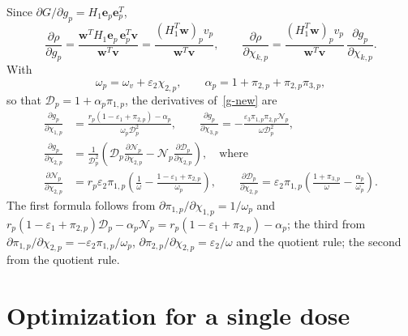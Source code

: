 \documentclass[11pt]{article}
\theoremstyle{plain}
\theoremstyle{remark}
\numberwithin{equation}{section}
\begin{document}
Since $\partial G/\partial g_p=H_1\bm e_p\bm e_p^T$,
\begin{equation}\label{drho-dg}
\frac{\partial\rho}{\partial g_p}=\frac{\bm w^TH_1\bm e_p\,\bm e_p^T\bm v}{\bm w^T\bm v}
=\frac{\left(H_1^T\bm w\right)_pv_p}{\bm w^T\bm v},
\qquad
\frac{\partial\rho}{\partial\chi_{k,p}}=\frac{\left(H_1^T\bm w\right)_pv_p}{\bm w^T\bm v}\,
\frac{\partial g_p}{\partial\chi_{k,p}}.
\end{equation}
With
\begin{equation}\label{omega-alpha}
\omega_p=\omega_v+\varepsilon_2\chi_{2,p},\qquad
\alpha_p=1+\pi_{2,p}+\pi_{2,p}\pi_{3,p},
\end{equation}
so that $\mathcal{D}_p=1+\alpha_p\pi_{1,p}$, the derivatives of~\eqref{g-new} are
\begin{equation}\label{dg}
\begin{aligned}
\frac{\partial g_p}{\partial\chi_{1,p}}&=\frac{r_p\left(1-\varepsilon_1+\pi_{2,p}\right)-\alpha_p}{\omega_p\mathcal{D}_p^2},\qquad
\frac{\partial g_p}{\partial\chi_{3,p}}=-\frac{\varepsilon_3\pi_{1,p}\pi_{2,p}\mathcal{N}_p}{\omega\mathcal{D}_p^2},\\
\frac{\partial g_p}{\partial\chi_{2,p}}&=\frac{1}{\mathcal{D}_p^2}\left(\mathcal{D}_p\frac{\partial\mathcal{N}_p}{\partial\chi_{2,p}}-\mathcal{N}_p\frac{\partial\mathcal{D}_p}{\partial\chi_{2,p}}\right),\quad\mbox{where}\\
\frac{\partial\mathcal{N}_p}{\partial\chi_{2,p}}&=r_p\varepsilon_2\pi_{1,p}\left(\frac{1}{\omega}-\frac{1-\varepsilon_1+\pi_{2,p}}{\omega_p}\right),\qquad
\frac{\partial\mathcal{D}_p}{\partial\chi_{2,p}}=\varepsilon_2\pi_{1,p}\left(\frac{1+\pi_{3,p}}{\omega}-\frac{\alpha_p}{\omega_p}\right).
\end{aligned}
\end{equation}
The first formula follows from $\partial\pi_{1,p}/\partial\chi_{1,p}=1/\omega_p$ and
$r_p(1-\varepsilon_1+\pi_{2,p})\mathcal{D}_p-\alpha_p\mathcal{N}_p
=r_p(1-\varepsilon_1+\pi_{2,p})-\alpha_p$; the third from
$\partial\pi_{1,p}/\partial\chi_{2,p}=-\varepsilon_2\pi_{1,p}/\omega_p$,
$\partial\pi_{2,p}/\partial\chi_{2,p}=\varepsilon_2/\omega$ and the quotient
rule; the second from the quotient rule.

\section{Optimization for a single dose}\label{sec-single}
\end{document}
